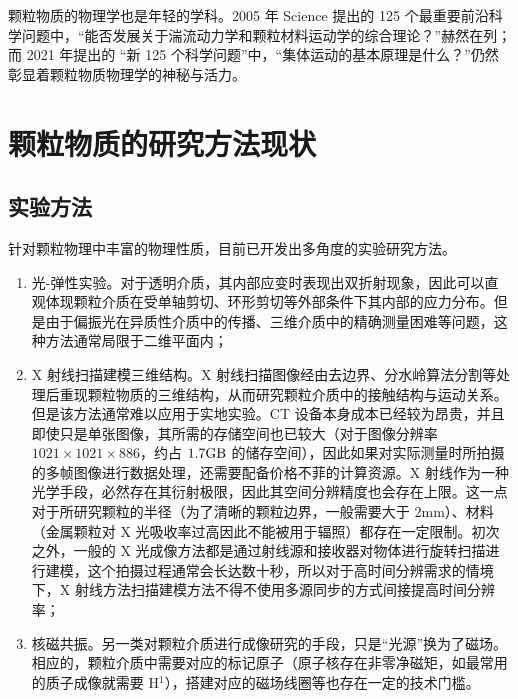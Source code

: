 颗粒物质的物理学也是年轻的学科。2005 年 Science 提出的 125 个最重要前沿科学问题\cite{doi:10.1126/science.309.5731.78b}中，“能否发展关于湍流动力学和颗粒材料运动学的综合理论？”赫然在列；而 2021 年提出的 “新 125 个科学问题”\cite{sanders2021125}中，“集体运动的基本原理是什么？”仍然彰显着颗粒物质物理学的神秘与活力。

\section{颗粒物质的研究方法现状}


\subsection{实验方法}

针对颗粒物理中丰富的物理性质，目前已开发出多角度的实验研究方法。

\begin{enumerate}
  \item 光-弹性实验\cite{photoelasticimetry}。对于透明介质，其内部应变时表现出双折射现象，因此可以直观体现颗粒介质在受单轴剪切、环形剪切等外部条件下其内部的应力分布。但是由于偏振光在异质性介质中的传播、三维介质中的精确测量困难等问题\cite{Non-Destructive_3D_Photoelasticity}，这种方法通常局限于二维平面内；
  \item X 射线扫描建模三维结构\cite{PhysRevE.68.020301}。X 射线扫描图像经由去边界、分水岭算法分割等处理后重现颗粒物质的三维结构，从而研究颗粒介质中的接触结构与运动关系。但是该方法通常难以应用于实地实验。CT 设备本身成本已经较为昂贵，并且即使只是单张图像，其所需的存储空间也已较大（对于图像分辨率 $1021\times 1021 \times 886$，约占 $1.7\unit{\giga\byte}$ 的储存空间），因此如果对实际测量时所拍摄的多帧图像进行数据处理，还需要配备价格不菲的计算资源。X 射线作为一种光学手段，必然存在其衍射极限，因此其空间分辨精度也会存在上限。这一点对于所研究颗粒的半径（为了清晰的颗粒边界，一般需要大于 $2\unit{\milli\meter}$）、材料（金属颗粒对 X 光吸收率过高因此不能被用于辐照）都存在一定限制。初次之外，一般的 X 光成像方法都是通过射线源和接收器对物体进行旋转扫描进行建模，这个拍摄过程通常会长达数十秒，所以对于高时间分辨需求的情境下，X 射线方法扫描建模方法不得不使用多源同步\cite{wang2008ultrafast}的方式间接提高时间分辨率；
  \item 核磁共振\cite{CLARKE2023}。另一类对颗粒介质进行成像研究的手段，只是“光源”换为了磁场。相应的，颗粒介质中需要对应的标记原子（原子核存在非零净磁矩，如最常用的质子成像就需要 H$^{1}$），搭建对应的磁场线圈等也存在一定的技术门槛。
\end{enumerate}

